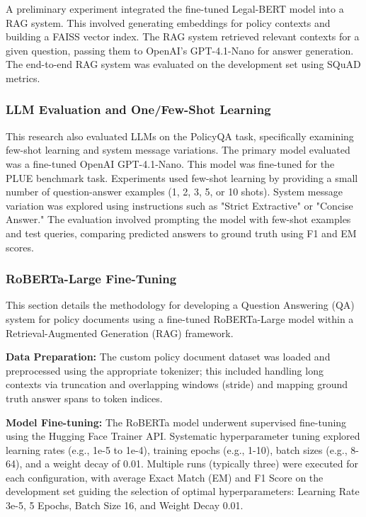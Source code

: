 \documentclass[11pt]{article}
\begin{document}
A preliminary experiment integrated the fine-tuned Legal-BERT model into a RAG system. This involved generating embeddings for policy contexts and building a FAISS vector index. The RAG system retrieved relevant contexts for a given question, passing them to OpenAI's GPT-4.1-Nano for answer generation. The end-to-end RAG system was evaluated on the development set using SQuAD metrics.

\subsubsection{LLM Evaluation and One/Few-Shot Learning}

This research also evaluated LLMs on the PolicyQA task, specifically examining few-shot learning and system message variations. The primary model evaluated was a fine-tuned OpenAI GPT-4.1-Nano. This model was fine-tuned for the PLUE benchmark task. Experiments used few-shot learning by providing a small number of question-answer examples (1, 2, 3, 5, or 10 shots). System message variation was explored using instructions such as "Strict Extractive" or "Concise Answer." The evaluation involved prompting the model with few-shot examples and test queries, comparing predicted answers to ground truth using F1 and EM scores.

\subsubsection{RoBERTa-Large Fine-Tuning}

This section details the methodology for developing a Question Answering (QA) system for policy documents using a fine-tuned RoBERTa-Large model within a Retrieval-Augmented Generation (RAG) framework.

\textbf{Data Preparation:} The custom policy document dataset was loaded and preprocessed using the appropriate tokenizer; this included handling long contexts via truncation and overlapping windows (stride) and mapping ground truth answer spans to token indices.

\textbf{Model Fine-tuning:} The RoBERTa model underwent supervised fine-tuning using the Hugging Face Trainer API. Systematic hyperparameter tuning explored learning rates (e.g., 1e-5 to 1e-4), training epochs (e.g., 1-10), batch sizes (e.g., 8-64), and a weight decay of 0.01. Multiple runs (typically three) were executed for each configuration, with average Exact Match (EM) and F1 Score on the development set guiding the selection of optimal hyperparameters: Learning Rate 3e-5, 5 Epochs, Batch Size 16, and Weight Decay 0.01.
\end{document}
